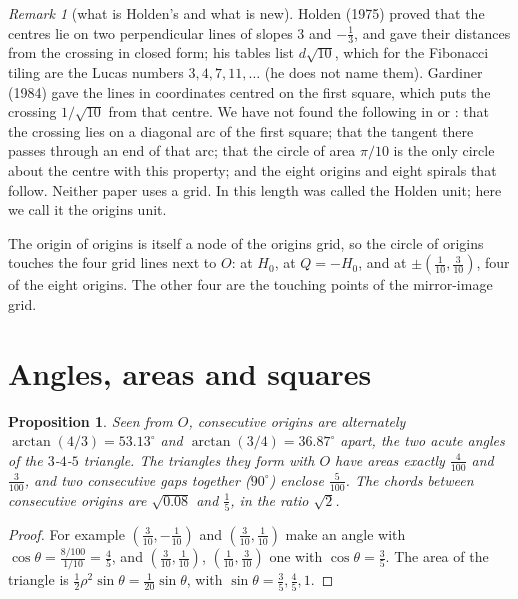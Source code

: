 \documentclass[11pt,a4paper]{article}
\theoremstyle{plain}
\newtheorem{proposition}[theorem]{Proposition}
\theoremstyle{definition}
\theoremstyle{remark}
\newtheorem{remark}[theorem]{Remark}
\begin{document}
\begin{remark}[what is Holden's and what is new]\label{rem:credit}
Holden (1975) proved that the centres lie on two perpendicular lines of slopes $3$ and $-\tfrac13$, and gave their distances from the crossing in closed form; his tables list $d\sqrt{10}$, which for the Fibonacci tiling are the Lucas numbers $3,4,7,11,\dots$ (he does not name them). Gardiner (1984) gave the lines in coordinates centred on the first square, which puts the crossing $1/\sqrt{10}$ from that centre. We have not found the following in \cite{holden} or \cite{gardiner}: that the crossing lies on a diagonal arc of the first square; that the tangent there passes through an end of that arc; that the circle of area $\pi/10$ is the only circle about the centre with this property; and the eight origins and eight spirals that follow. Neither paper uses a grid. In \cite{rhombus} this length was called the Holden unit; here we call it the origins unit.
\end{remark}

The origin of origins is itself a node of the origins grid, so the circle of origins touches the four grid lines next to $O$: at $H_0$, at $Q=-H_0$, and at $\pm(\tfrac1{10},\tfrac3{10})$, four of the eight origins. The other four are the touching points of the mirror-image grid.

\section{Angles, areas and squares}

\begin{proposition}\label{prop:angles}
Seen from $O$, consecutive origins are alternately $\arctan(4/3)=53.13^\circ$ and $\arctan(3/4)=36.87^\circ$ apart, the two acute angles of the $3$-$4$-$5$ triangle. The triangles they form with $O$ have areas exactly $\tfrac4{100}$ and $\tfrac3{100}$, and two consecutive gaps together ($90^\circ$) enclose $\tfrac5{100}$. The chords between consecutive origins are $\sqrt{0.08}$ and $\tfrac15$, in the ratio $\sqrt2$.
\end{proposition}

\begin{proof}
For example $(\tfrac3{10},-\tfrac1{10})$ and $(\tfrac3{10},\tfrac1{10})$ make an angle with $\cos\theta = \tfrac{8/100}{1/10}=\tfrac45$, and $(\tfrac3{10},\tfrac1{10})$, $(\tfrac1{10},\tfrac3{10})$ one with $\cos\theta=\tfrac35$. The area of the triangle is $\tfrac12\rho^2\sin\theta=\tfrac1{20}\sin\theta$, with $\sin\theta = \tfrac35,\tfrac45,1$.
\end{proof}
\end{document}
